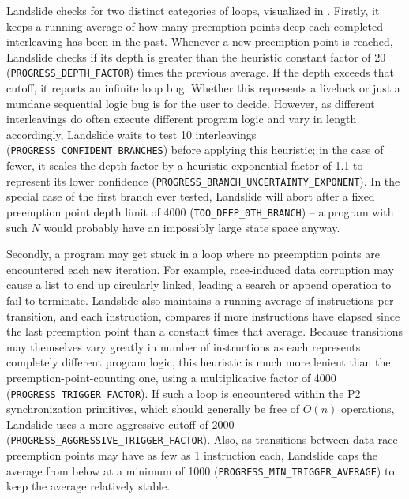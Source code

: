 Landslide checks for two distinct categories of  loops,
visualized in .
Firstly, it keeps a running average of how many preemption points deep each completed interleaving has been in the past.
Whenever a new preemption point is reached, Landslide checks
if its depth is greater than the heuristic constant factor of 20
({\tt PROGRESS\_DEPTH\_\allowbreak{}FACTOR})
times the previous average.
If the depth exceeds that cutoff, it reports an infinite loop bug.
Whether this represents a livelock or just a mundane sequential logic bug is for the user to decide.
However, as
different interleavings do
often execute different program logic and vary in length accordingly,
Landslide waits to test 10 interleavings ({\tt PROGRESS\_CONFIDENT\_\allowbreak{}BRANCHES})
before applying this heuristic;
in the case of fewer,
it scales the depth factor by a heuristic exponential factor of 1.1
to represent its lower confidence
({\tt PROGRESS\_BRANCH\_UNCERTAINTY\_EXPONENT}).
In the special case of the first branch ever tested,
Landslide will abort after a fixed preemption point depth limit of 4000 ({\tt TOO\_DEEP\_0TH\_BRANCH})
-- a program with such $N$ would probably have an impossibly large state space anyway.

Secondly, a program may get stuck in a loop where no preemption points are encountered each new iteration.
For example, race-induced data corruption may cause a list to end up circularly linked, %
leading a search or append operation to fail to terminate.
Landslide also maintains a running average of instructions per transition,
and each instruction, compares if more instructions have elapsed since the last preemption point
than a constant times that average.
Because transitions may themselves vary greatly in number of instructions as each represents completely different program logic,
this heuristic is much more lenient than the preemption-point-counting one,
using a multiplicative factor of 4000 ({\tt PROGRESS\_TRIGGER\_FACTOR}).
If such a loop is encountered within the P2 synchronization primitives,
which should generally be free of $O(n)$ operations,
Landslide uses a more aggressive cutoff of 2000
({\tt PROGRESS\_AGGRESSIVE\_TRIGGER\_FACTOR}).
Also, as transitions between data-race preemption points may have as few as 1 instruction each,
Landslide caps the average from below at a minimum of 1000 ({\tt PROGRESS\_MIN\_TRIGGER\_AVERAGE})
to keep the average relatively stable.

